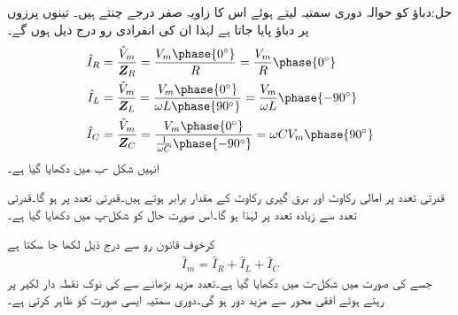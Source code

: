 حل:دباؤ  کو حوالہ دوری سمتیہ لیتے ہوئے اس کا زاویہ صفر درجے چنتے ہیں۔ تینوں پرزوں پر   دباؤ پایا جاتا ہے لہٰذا ان کی انفرادی رو درج ذیل ہوں گے۔
\begin{align*}
\hat{I}_R&=\frac{\hat{V}_m}{\bZ_R}=\frac{V_m\phase{0^{\circ}}}{R}=\frac{V_m}{R}\phase{0^{\circ}}\\
\hat{I}_L&=\frac{\hat{V}_m}{\bZ_L}=\frac{V_m\phase{0^{\circ}}}{\omega L \phase{90^{\circ}}}=\frac{V_m}{\omega L} \phase{-90^{\circ}}\\
\hat{I}_C&=\frac{\hat{V}_m}{\bZ_C}=\frac{V_m \phase{0^{\circ}}}{\frac{1}{\omega C} \phase{-90^{\circ}}}=\omega C V_m \phase{90^{\circ}}
\end{align*}
انہیں شکل -ب میں دکھایا گیا ہے۔

قدرتی تعدد  پر امالی رکاوٹ اور برق گیری رکاوٹ کے  مقدار برابر  ہوتے ہیں۔قدرتی تعدد پر  ہو گا۔قدرتی تعدد سے زیادہ تعدد پر  لہٰذا  ہو گا۔اس صورت حال کو شکل-پ میں دکھایا گیا ہے۔

کرخوف قانون رو سے درج ذیل لکھا جا سکتا ہے
\begin{align*}
\hat{I}_m=\hat{I}_R+\hat{I}_L+\hat{I}_C
\end{align*}
جسے   کی صورت میں  شکل-ت میں دکھایا گیا ہے۔تعدد مزید بڑھانے سے  کی نوک نقطہ دار لکیر پر رہتے ہوئے افقی محور سے مزید دور ہو گی۔دوری سمتیہ  ایسی صورت کو ظاہر کرتی ہے۔

